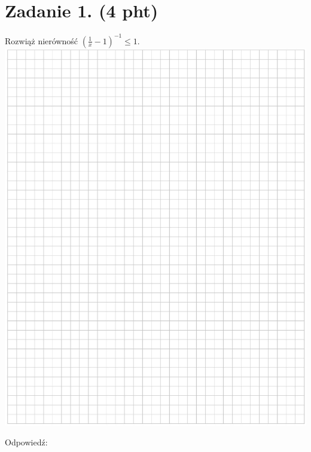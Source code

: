 \documentclass[10pt]{article}
\begin{document}
\section*{Zadanie 1. (4 pht)}
Rozwiąż nierówność \(\left(\frac{1}{x}-1\right)^{-1} \leq 1\).\\
\includegraphics[max width=\textwidth, center]{2024_11_21_ebf83f11df6f4915f701g-02}

Odpowiedź:
\end{document}
